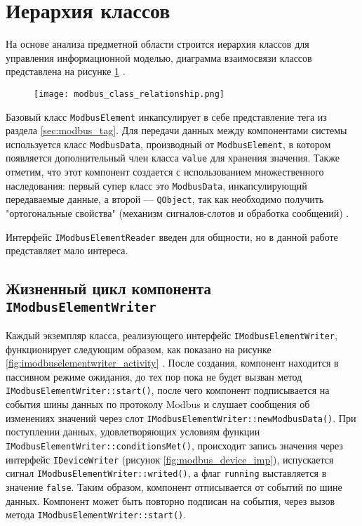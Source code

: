 \section{Иерархия классов}
На основе анализа предметной области строится иерархия классов для управления информационной моделью,
диаграмма взаимосвязи классов представлена на рисунке \ref{fig:modbus_class_uml} \cite[стр. 223]{book:oop:oop_analize}. 
\begin{landscape}
    \begin{center}
        \begin{figure}[h!]
            \texttt{[image: modbus\_class\_relationship.png]}
            \caption{}\label{fig:modbus_class_uml}
        \end{figure}
    \end{center}
\end{landscape}
Базовый класс \texttt{ModbusElement} инкапсулирует в себе представление тега из раздела \ref{sec:modbus_tag}.
Для передачи данных между компонентами системы используется класс \texttt{ModbusData}, производный от \texttt{ModbusElement},
в котором появляется дополнительный член класса \texttt{value} для хранения значения.
Также отметим, что этот компонент создается с использованием множественного наследования:
первый супер класс это \texttt{ModbusData}, инкапсулирующий передаваемые данные,
а второй --- \texttt{QObject}, так как необходимо получить "ортогональные свойства" (механизм сигналов-слотов и обработка сообщений) \cite[стр. 134]{book:oop:oop_analize}.

Интерфейс \texttt{IModbusElementReader} введен для общности,
но в данной работе представляет мало интереса.


\subsection{Жизненный цикл компонента \texttt{IModbusElementWriter}}
Каждый экземпляр класса, реализующего интерфейс \texttt{IModbusElementWriter},
функционирует следующим образом, как показано на рисунке \ref{fig:imodbuselementwriter_activity} \cite[стр. 217]{book:oop:oop_analize}.
После создания, компонент находится в пассивном режиме ожидания, до тех пор пока не будет вызван
метод \texttt{IModbusElementWriter::start()}, после чего компонент подписывается на события шины данных по протоколу Modbus
и слушает сообщения об изменениях значений через слот \texttt{IModbusElementWriter::newModbusData()}.
При поступлении данных, удовлетворяющих условиям функции \texttt{IModbusElementWriter::conditionsMet()},
происходит запись значения через интерфейс \texttt{IDeviceWriter} (рисунок \ref{fig:modbus_device_imp}),
испускается сигнал \texttt{IModbusElementWriter::writed()},
а флаг \texttt{running} выставляется в значение \texttt{false}.
Таким образом, компонент отписывается от событий по шине данных.
Компонент может быть повторно подписан на события, через вызов метода \texttt{IModbusElementWriter::start()}.

